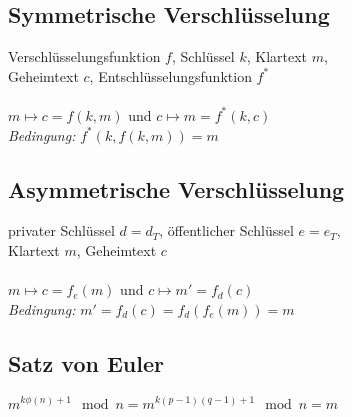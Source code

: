 \subsection{Symmetrische Verschlüsselung}
Verschlüsselungsfunktion $f$, Schlüssel $k$, Klartext $m$, \\
Geheimtext $c$, Entschlüsselungsfunktion $f^*$ \\
\\
$ m \mapsto c = f(k,m) $ und $ c \mapsto m = f^*(k,c) $ \\
\textit{Bedingung:} $ f^* (k, f(k, m)) = m $

\subsection{Asymmetrische Verschlüsselung}
privater Schlüssel $d = d_T$, öffentlicher Schlüssel $e = e_T$, \\
Klartext $m$, Geheimtext $c$ \\
\\
$ m \mapsto c = f_e(m) $ und $ c \mapsto m' = f_d(c) $ \\
\textit{Bedingung:} $ m' = f_d(c) = f_d(f_e(m)) = m $

\subsection{Satz von Euler}
$ m^{k \phi (n) + 1} \mod n = m^{k(p-1)(q-1) + 1} \mod n = m $

